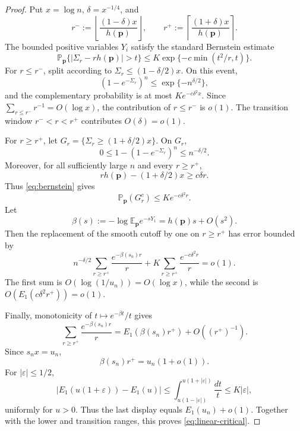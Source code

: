 \documentclass[journal]{IEEEtran}
\theoremstyle{plain}
\theoremstyle{definition}
\theoremstyle{remark}
\newcommand{\Paux}{\mathbb P_{\mathbf p}}
\newcommand{\Eaux}{\mathbb E_{\mathbf p}}
\newcommand{\hp}{h(\mathbf p)}
\begin{document}
\begin{proof}
Put $x=\log n$, $\delta=x^{-1/4}$, and
\begin{equation*}
 r^-:=\left\lfloor\frac{(1-\delta)x}{\hp}\right\rfloor,
 \qquad
 r^+:=\left\lceil\frac{(1+\delta)x}{\hp}\right\rceil.
\end{equation*}
The bounded positive variables $Y_i$ satisfy the standard Bernstein estimate \cite[Chap.~2]{BoucheronLugosiMassart2013}
\begin{equation}\label{eq:bernstein}
 \Paux\{|\Sigma_r-r\hp|>t\}
 \le K\exp\{-c\min(t^2/r,t)\}.
\end{equation}
For $r\le r^-$, split according to
$\Sigma_r\le(1-\delta/2)x$.  On this event,
\begin{equation*}
 (1-e^{-\Sigma_r})^n\le\exp\{-n^{\delta/2}\},
\end{equation*}
and the complementary probability is at most $Ke^{-c\delta^2x}$.  Since $\sum_{r\le r^-}r^{-1}=O(\log x)$, the contribution of $r\le r^-$ is $o(1)$.  The transition window $r^-<r<r^+$ contributes $O(\delta)=o(1)$.

For $r\ge r^+$, let $G_r=\{\Sigma_r\ge(1+\delta/2)x\}$.  On $G_r$,
\begin{equation*}
 0\le1-(1-e^{-\Sigma_r})^n\le n^{-\delta/2}.
\end{equation*}
Moreover, for all sufficiently large $n$ and every $r\ge r^+$,
\begin{equation*}
 r\hp-(1+\delta/2)x\ge c\delta r.
\end{equation*}
Thus \eqref{eq:bernstein} gives
\begin{equation*}
 \Paux(G_r^c)\le Ke^{-c\delta^2r}.
\end{equation*}
Let
\begin{equation*}
 \beta(s):=-\log\Eaux e^{-sY_1}=\hp s+O(s^2).
\end{equation*}
Then the replacement of the smooth cutoff by one on $r\ge r^+$ has error bounded by
\begin{equation*}
 n^{-\delta/2}\sum_{r\ge r^+}\frac{e^{-\beta(s_n)r}}r
 +K\sum_{r\ge r^+}\frac{e^{-c\delta^2r}}r=o(1).
\end{equation*}
The first sum is $O(\log(1/u_n))=O(\log x)$, while the second is
$O(E_1(c\delta^2r^+))=o(1)$.

Finally, monotonicity of $t\mapsto e^{-\beta t}/t$ gives
\begin{equation*}
 \sum_{r\ge r^+}\frac{e^{-\beta(s_n)r}}r
 =E_1(\beta(s_n)r^+)+O((r^+)^{-1}).
\end{equation*}
Since $s_nx=u_n$,
\begin{equation*}
 \beta(s_n)r^+=u_n(1+o(1)).
\end{equation*}
For $|\varepsilon|\le1/2$,
\begin{equation*}
 |E_1(u(1+\varepsilon))-E_1(u)|
 \le\int_{u(1-|\varepsilon|)}^{u(1+|\varepsilon|)}\frac{dt}{t}
 \le K|\varepsilon|,
\end{equation*}
uniformly for $u>0$.  Thus the last display equals $E_1(u_n)+o(1)$.  Together with the lower and transition ranges, this proves \eqref{eq:linear-critical}.
\end{proof}
\end{document}
